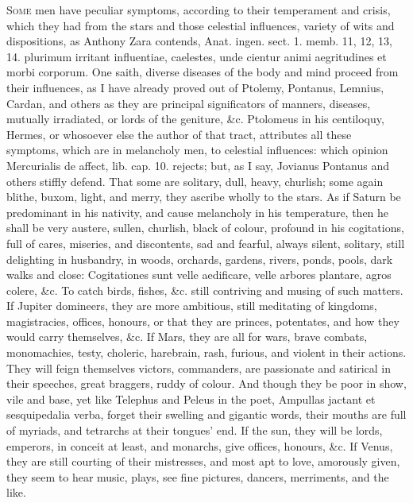 {\lettrine{S}{ome} men have peculiar symptoms, according to their temperament and
crisis, which they had from the stars and those celestial influences,
variety of wits and dispositions, as Anthony Zara contends, Anat.
ingen. sect. 1. memb. 11, 12, 13, 14. plurimum irritant influentiae,
caelestes, unde cientur animi aegritudines et morbi corporum. One
saith, diverse diseases of the body and mind proceed from their
influences, as I have already proved out of Ptolemy, Pontanus,
Lemnius, Cardan, and others as they are principal significators of
manners, diseases, mutually irradiated, or lords of the geniture, \&c.
Ptolomeus in his centiloquy, Hermes, or whosoever else the author of
that tract, attributes all these symptoms, which are in melancholy men,
to celestial influences: which opinion Mercurialis de affect, lib. cap.
10. rejects; but, as I say, Jovianus Pontanus and others stiffly
defend. That some are solitary, dull, heavy, churlish; some again
blithe, buxom, light, and merry, they ascribe wholly to the stars. As
if Saturn be predominant in his nativity, and cause melancholy in his
temperature, then he shall be very austere, sullen, churlish,
black of colour, profound in his cogitations, full of cares, miseries,
and discontents, sad and fearful, always silent, solitary, still
delighting in husbandry, in woods, orchards, gardens, rivers, ponds,
pools, dark walks and close: Cogitationes sunt velle aedificare, velle
arbores plantare, agros colere, \&c. To catch birds, fishes, \&c. still
contriving and musing of such matters. If Jupiter domineers, they are
more ambitious, still meditating of kingdoms, magistracies, offices,
honours, or that they are princes, potentates, and how they would carry
themselves, \&c. If Mars, they are all for wars, brave combats,
monomachies, testy, choleric, harebrain, rash, furious, and violent in
their actions. They will feign themselves victors, commanders, are
passionate and satirical in their speeches, great braggers, ruddy of
colour. And though they be poor in show, vile and base, yet like
Telephus and Peleus in the poet, Ampullas jactant et
sesquipedalia verba, forget their swelling and gigantic words, their
mouths are full of myriads, and tetrarchs at their tongues' end. If the
sun, they will be lords, emperors, in conceit at least, and monarchs,
give offices, honours, \&c. If Venus, they are still courting of their
mistresses, and most apt to love, amorously given, they seem to hear
music, plays, see fine pictures, dancers, merriments, and the like.
}
